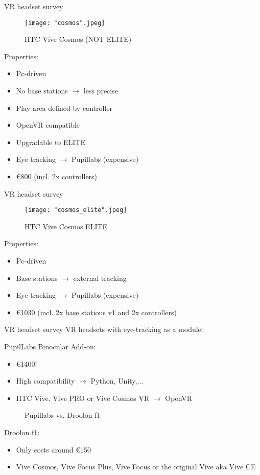 \documentclass{beamer}
\begin{document}
\begin{frame}{VR headset survey}
	\begin{figure}
		\texttt{[image: "cosmos".jpeg]}
		\caption{HTC Vive Cosmos (NOT ELITE)}
	\end{figure}
	
	Properties:
	\begin{itemize}
	\item Pc-driven
	\item No base stations $\rightarrow$ less precise
  	\item Play area defined by controller
  	\item OpenVR compatible
	\item Upgradable to ELITE
	\item Eye tracking $\rightarrow$ Pupillabs (expensive)
	\item €800 (incl. 2x controllers)
\end{itemize}
\end{frame}

\begin{frame}{VR headset survey}
	\begin{figure}
		\texttt{[image: "cosmos\_elite".jpeg]}
		\caption{HTC Vive Cosmos ELITE}
	\end{figure}
	
	Properties:
	\begin{itemize}
		\item Pc-driven
		\item Base stations $\rightarrow$ external tracking
		\item Eye tracking $\rightarrow$ Pupillabs (expensive)
		\item €1030 (incl. 2x base stations v1 and 2x controllers)
	\end{itemize}
\end{frame}

\begin{frame}{VR headset survey}
	VR headsets with eye-tracking as a module:
	\vspace{0.5cm}
	
	PupilLabs Binocular Add-on:
	\begin{itemize}
		\item €1400!
		\item High compatibility $\rightarrow$ Python, Unity,...
		\item HTC Vive, Vive PRO or Vive Cosmos VR $\rightarrow$ OpenVR
	\end{itemize} 
	
	\begin{figure}
		\centering
		\qquad
		\caption{Pupillabs vs. Droolon f1}%
		\label{fig:example}%
	\end{figure}
	
	Droolon f1:
	\begin{itemize}
		\item Only costs around €150
		\item Vive Cosmos, Vive Focus Plus, Vive Focus or the original Vive aka Vive CE
	\end{itemize}
\end{frame}
\end{document}
